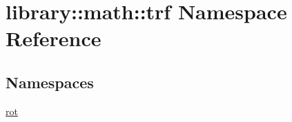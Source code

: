 \hypertarget{namespacelibrary_1_1math_1_1trf}{}\section{library\+:\+:math\+:\+:trf Namespace Reference}
\label{namespacelibrary_1_1math_1_1trf}
\subsection*{Namespaces}
\begin{DoxyCompactItemize}
\item 
 \hyperlink{namespacelibrary_1_1math_1_1trf_1_1rot}{rot}
\end{DoxyCompactItemize}
